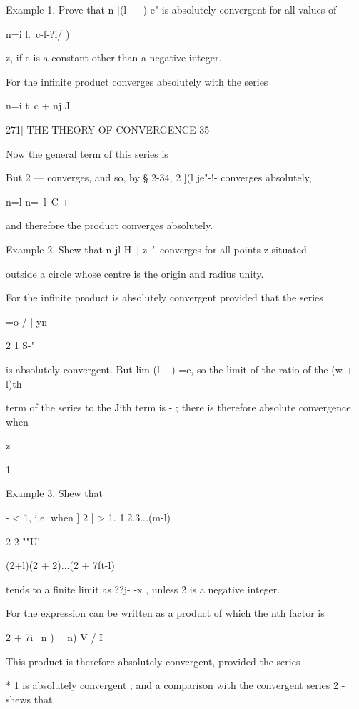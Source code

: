 Example 1. Prove that n ](l — ) e" is absolutely convergent for all
values of

n=i l.\ c-f-?i/ )

z, if c is a constant other than a negative integer.

For the infinite product converges absolutely with the series

n=i t\ c + nj J



271] THE THEORY OF CONVERGENCE 35

Now the general term of this series is

But 2 — converges, and so, by § 2-34, 2 ](l je"-!- converges
absolutely,

n=l n=\ l\ C + %

and therefore the product converges absolutely.

Example 2. Shew that n jl-H--] z~'\ converges for all points z
situated

outside a circle whose centre is the origin and radius unity.

For the infinite product is absolutely convergent provided that the
series

=o / ] yn

2 1 S-"

is absolutely convergent. But lim (l -- ) =e, so the limit of the
ratio of the (w + l)th

term of the series to the Jith term is - ; there is therefore absolute
convergence when

z

1



Example 3. Shew that



- < 1, i.e. when ] 2 | > 1. 1.2.3...(m-l)



2 2 ""U'



(2+l)(2 + 2)...(2 + 7ft-l)

tends to a finite limit as ??j- -x , unless 2 is a negative integer.

For the expression can be written as a product of which the nth factor
is

2 + 7i \ n ) ~\ n) V / I

This product is therefore absolutely convergent, provided the series

* 1 is absolutely convergent ; and a comparison with the convergent
series 2 - shews that

